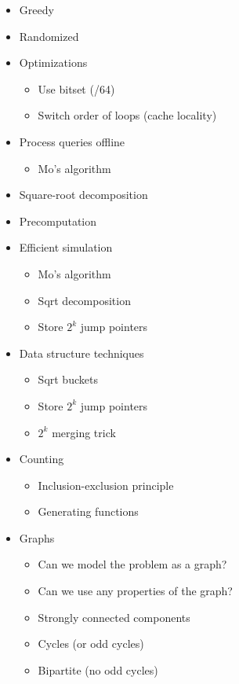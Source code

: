 \documentclass[9pt,a4paper,landscape,oneside]{amsart}
\newenvironment{myitemize}
{\begin{itemize}[leftmargin=.3cm]
	\setlength{\itemsep}{0pt}
	\setlength{\parskip}{0pt}
	\setlength{\parsep}{0pt}     }
{ \end{itemize}                  }
\begin{document}
\begin{multicols*}{3}
\begin{myitemize}
\begin{myitemize}
\begin{myitemize}
\begin{myitemize}
						\end{myitemize}
				\end{myitemize}
		\end{myitemize}
	\item Greedy
	\item Randomized
	\item Optimizations
		\begin{myitemize}
			\item Use bitset (/64)
			\item Switch order of loops (cache locality)
		\end{myitemize}
	\item Process queries offline
		\begin{myitemize}
			\item Mo's algorithm
		\end{myitemize}
	\item Square-root decomposition
	\item Precomputation
	\item Efficient simulation
		\begin{myitemize}
			\item Mo's algorithm
			\item Sqrt decomposition
			\item Store $2^k$ jump pointers
		\end{myitemize}
	\item Data structure techniques
		\begin{myitemize}
			\item Sqrt buckets
			\item Store $2^k$ jump pointers
			\item $2^k$ merging trick
		\end{myitemize}
	\item Counting
		\begin{myitemize}
			\item Inclusion-exclusion principle
			\item Generating functions
		\end{myitemize}
	\item Graphs
		\begin{myitemize}
			\item Can we model the problem as a graph?
			\item Can we use any properties of the graph?
			\item Strongly connected components
			\item Cycles (or odd cycles)
			\item Bipartite (no odd cycles)

\end{myitemize}
\end{myitemize}
\end{multicols*}
\end{document}
